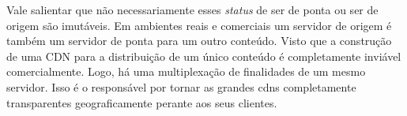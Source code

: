 Vale salientar que n\~ao necessariamente esses \textit{status} de ser de ponta ou ser de origem s\~ao imut\'aveis. Em ambientes reais e comerciais um servidor de origem \'e tamb\'em um servidor de ponta para um outro conte\'udo. Visto que a constru\c{c}\~ao de uma CDN para a distribui\c{c}\~ao de um \'unico conte\'udo \'e completamente invi\'avel comercialmente. Logo, h\'a uma multiplexa\c{c}\~ao de finalidades de um mesmo servidor. Isso \'e o respons\'avel por tornar as grandes cdns completamente transparentes geograficamente perante aos seus clientes.